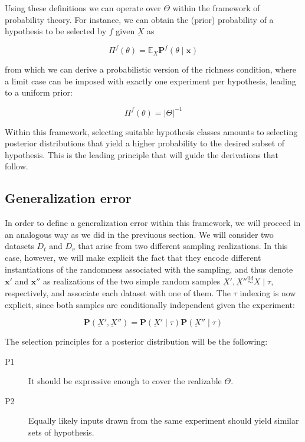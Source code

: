 Using these definitions we can operate over $\Theta$ within the framework of probability 
theory. For instance, we can obtain the (prior) probability of a hypothesis to be
selected by $f$ given $\underbar{X}$ as

$$
 \Pi^f (\theta) = \mathbb{E}_X \mathbf{P}^f (\theta \mid \bm{x})
$$

from which we can derive a probabilistic version of the richness condition, where a limit
case can be imposed with exactly one experiment per hypothesis, leading to a uniform prior:

$$
\Pi^f (\theta) = |\Theta|^{-1}
$$

Within this framework, selecting suitable hypothesis classes amounts to selecting
posterior distributions that yield a higher probability to the desired subset of hypothesis. This
is the leading principle that will guide the derivations that follow.

\subsection{Generalization error}

In order to define a generalization error within this framework, we will proceed in an
analogous way as we did in the previuous section. We will consider two datasets $D_t$ and $D_v$
that arise from two different sampling realizations. In this case, however, we will make
explicit the fact that they encode different instantiations of the randomness associated
with the sampling, and thus denote $\bm{x'}$ and $\bm{x''}$ as realizations of the two simple random
samples $\underbar{X}', \underbar{X}'' \overset{\text{iid}}{\sim} X \mid \tau$, respectively, and associate
each dataset with one of them. The $\tau$ indexing is now explicit, since both samples are conditionally
independent given the experiment:

$$
    \mathbf{P}(\underbar{X}', \underbar{X}'') = \mathbf{P}(\underbar{X}' \mid \tau) \mathbf{P}(\underbar{X}'' \mid \tau)
$$

The selection principles for a posterior distribution will be the following:
\vspace{-2mm}
\begin{description}
    \item[P1] It should be expressive enough to cover the realizable $\Theta$.
    \vspace{-3mm}
    \item[P2] Equally likely inputs drawn from the same experiment should yield similar sets of hypothesis.
\end{description}

